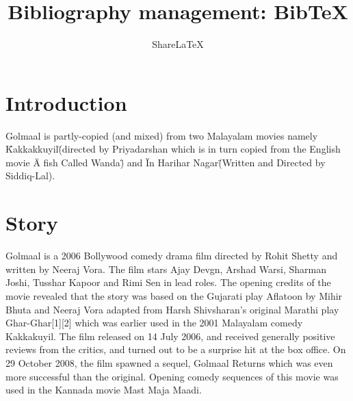 \documentclass[a4paper,10pt]{article}
\title{Bibliography management: BibTeX}
\author{Share\LaTeX}
\begin{document}
\maketitle

\section{Introduction}
Golmaal is partly-copied (and mixed) from two Malayalam movies namely \"Kakkakkuyil\" (directed by Priyadarshan which is in turn copied from the English movie \"A fish Called Wanda\") and \"In Harihar Nagar\" (Written and Directed by Siddiq-Lal).
\section{Story}
Golmaal is a 2006 Bollywood comedy drama film directed by Rohit Shetty and written by Neeraj Vora.
The film stars Ajay Devgn, Arshad Warsi, Sharman Joshi, Tusshar Kapoor and Rimi Sen in lead roles. 
The opening credits of the movie revealed that the story was based on the Gujarati play Aflatoon by Mihir Bhuta and Neeraj Vora adapted from Harsh Shivsharan's original Marathi play Ghar-Ghar[1][2] which was earlier used in the 2001 Malayalam comedy Kakkakuyil. The film released on 14 July 2006, and received generally positive reviews from the critics, and turned out to be a surprise hit at the box office. On 29 October 2008, the film spawned a sequel, Golmaal Returns which was even more successful than the original. Opening comedy sequences of this movie was used in the Kannada movie Mast Maja Maadi.
\end{document}
